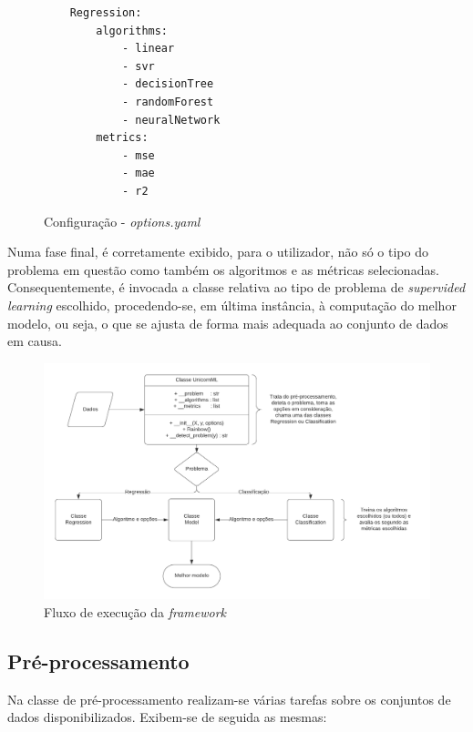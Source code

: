 \documentclass[a4paper]{report}
\begin{document}
{\begin{figure}[H]
\begin{verbatim}
    Regression:
        algorithms:
            - linear
            - svr
            - decisionTree
            - randomForest
            - neuralNetwork
        metrics:
            - mse
            - mae
            - r2
        \end{verbatim}
        \vspace{-5mm}
        \caption{Configuração - \textsl{options.yaml}}
        \label{fig:2}
	\end{figure}

		Numa fase final, é corretamente exibido, para o utilizador, não só o tipo do problema em questão como também os algoritmos e as métricas selecionadas.
		Consequentemente, é invocada a classe relativa ao tipo de problema de \textit{supervided learning} escolhido, procedendo-se, em última instância, à computação do melhor modelo, ou seja, o que se ajusta de forma mais adequada ao conjunto de dados em causa.

		\begin{figure}[H]
			\centering
			\includegraphics[width=1.0\textwidth]{Images/Diagram.png}
			\caption{Fluxo de execução da \textit{framework}}
			\label{fig:3}
		\end{figure}

		\subsection{Pré-processamento} \label{subsec:Pre-Processing}
		Na classe de pré-processamento realizam-se várias tarefas sobre os conjuntos de dados disponibilizados.
		Exibem-se de seguida as mesmas:

}
\end{document}
